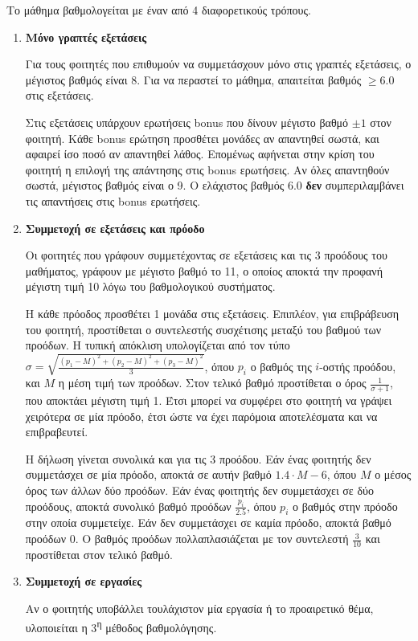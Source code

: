 \documentclass[11pt,a4paper,notitlepage,fleqn,final]{article}
\begin{document}
Το μάθημα βαθμολογείται με έναν από 4 διαφορετικούς τρόπους.
\begin{enumerate}
	\item \textbf{Μόνο γραπτές εξετάσεις}
	
	Για τους φοιτητές που επιθυμούν να συμμετάσχουν μόνο στις γραπτές εξετάσεις, ο μέγιστος βαθμός είναι 8. Για να περαστεί το μάθημα, απαιτείται βαθμός \( \geq 6.0 \) στις εξετάσεις. 
	
	Στις εξετάσεις υπάρχουν ερωτήσεις bonus που δίνουν μέγιστο βαθμό \( \pm 1 \) στον φοιτητή. Κάθε bonus ερώτηση προσθέτει μονάδες αν απαντηθεί σωστά, και αφαιρεί ίσο ποσό αν απαντηθεί λάθος. Επομένως αφήνεται στην κρίση του φοιτητή η επιλογή της απάντησης στις bonus ερωτήσεις. Αν όλες απαντηθούν σωστά, μέγιστος βαθμός είναι ο 9. Ο ελάχιστος βαθμός \( 6.0 \) \textbf{δεν} συμπεριλαμβάνει τις απαντήσεις στις bonus ερωτήσεις.
	\item \textbf{Συμμετοχή σε εξετάσεις και πρόοδο}
	
	Οι φοιτητές που γράφουν συμμετέχοντας σε εξετάσεις και τις 3 προόδους του μαθήματος, γράφουν με μέγιστο βαθμό το 11, ο οποίος
	αποκτά την προφανή μέγιστη τιμή 10 λόγω του βαθμολογικού συστήματος.
	
	Η κάθε πρόοδος προσθέτει 1 μονάδα στις εξετάσεις. Επιπλέον, για επιβράβευση του φοιτητή, προστίθεται ο συντελεστής συσχέτισης μεταξύ του βαθμού των προόδων. Η τυπική απόκλιση υπολογίζεται από τον τύπο \( \sigma = \sqrt{\frac{(p_1-M)^2+(p_2-M)^2+(p_3-M)^2}{3}} \), όπου \( p_i \) ο βαθμός της \(i\)-οστής προόδου, και \( M \) η μέση τιμή των προόδων. Στον τελικό βαθμό προστίθεται ο όρος \( \frac{1}{\sigma+1} \), που αποκτάει μέγιστη τιμή 1. Έτσι μπορεί να συμφέρει στο
	φοιτητή να γράψει χειρότερα σε μία πρόοδο, έτσι ώστε να έχει παρόμοια αποτελέσματα και να επιβραβευτεί.
	
	Η δήλωση γίνεται συνολικά και για τις 3 προόδου. Εάν ένας φοιτητής δεν συμμετάσχει σε μία πρόοδο, αποκτά σε αυτήν βαθμό \( 1.4\cdot M - 6 \), όπου \( M  \) ο μέσος όρος των άλλων δύο προόδων. Εάν ένας φοιτητής δεν συμμετάσχει σε δύο προόδους, αποκτά
	συνολικό βαθμό προόδων \( \frac{p_i}{2.5} \), όπου \( p_i \) ο βαθμός στην πρόοδο στην οποία συμμετείχε. Εάν δεν συμμετάσχει
	σε καμία πρόοδο, αποκτά βαθμό προόδων 0. Ο βαθμός προόδων πολλαπλασιάζεται με τον συντελεστή \( \frac{3}{10} \) και προστίθεται στον τελικό βαθμό.
	\item \textbf{Συμμετοχή σε εργασίες}

	Αν ο φοιτητής υποβάλλει τουλάχιστον μία εργασία ή το προαιρετικό θέμα, υλοποιείται η 3\textsuperscript{η} μέθοδος βαθμολόγησης.
	

\end{enumerate}
\end{document}
